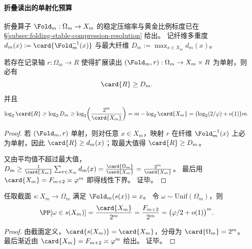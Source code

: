 \paragraph{折叠读出的单射化预算}
折叠算子 \(\Fold_m:\Omega_m\to X_m\) 的稳定压缩率与黄金比例标度已在 \S\ref{subsec:folding-stable-compression-resolution} 给出。
记纤维多重度 \(d_m(x):=\card{\Fold_m^{-1}(x)}\) 与最大纤维 \(D_m:=\max_{x\in X_m}d_m(x)\)。

\begin{proposition}[折叠逆向单射化的记录轴下界]\label{prop:spg-fold-injectivization-register-lower-bound}
若存在记录轴 \(r:\Omega_m\to R\) 使得扩展读出 \((\Fold_m,r):\Omega_m\to X_m\times R\) 为单射，则必有
\[
\card{R}\ge D_m.
\]
并且
\[
\log_2\card{R}\ge \log_2 D_m\ge \log_2\!\left(\frac{2^m}{\card{X_m}}\right)
=m-\log_2\card{X_m}
=\bigl(\log_2(2/\varphi)+o(1)\bigr)m.
\]
\end{proposition}
\begin{proof}
若 \((\Fold_m,r)\) 单射，则对任意 \(x\in X_m\)，映射 \(r\) 在纤维 \(\Fold_m^{-1}(x)\) 上必为单射，因此 \(\card{R}\ge d_m(x)\)；取最大值得 \(\card{R}\ge D_m\)。
\par
又由平均值不超过最大值，
\(
D_m\ge \frac{1}{\card{X_m}}\sum_{x\in X_m}d_m(x)=\frac{\card{\Omega_m}}{\card{X_m}}=\frac{2^m}{\card{X_m}}
\)。
最后用 \(\card{X_m}=F_{m+2}\asymp\varphi^m\) 即得线性下界。
证毕。
\end{proof}

\begin{corollary}[无外置记录的确定性截面覆盖指数稀薄]\label{cor:spg-fold-section-exponentially-thin}
任取截面 \(s:X_m\to\Omega_m\) 满足 \(\Fold_m(s(x))=x\)。
令 \(\omega\sim\mathrm{Unif}(\Omega_m)\)，则
\[
\PP[\omega\in s(X_m)]
=\frac{\card{X_m}}{2^m}
=\frac{F_{m+2}}{2^m}
=\bigl(\varphi/2+o(1)\bigr)^m.
\]
\end{corollary}
\begin{proof}
由截面定义，\(\card{s(X_m)}=\card{X_m}\)，分母为 \(\card{\Omega_m}=2^m\)。
最后渐近由 \(\card{X_m}=F_{m+2}\asymp\varphi^m\) 给出。
证毕。
\end{proof}

